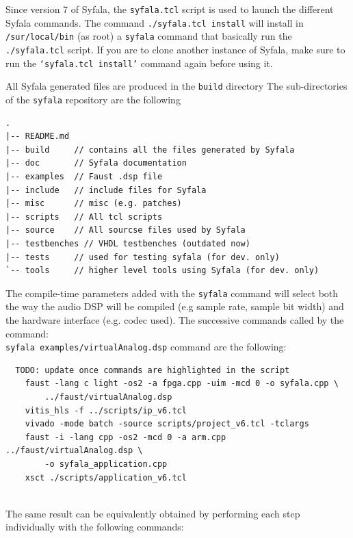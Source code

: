 \documentclass[11pt]{article}
\numberwithin{equation}{section}
\numberwithin{figure}{section}
\begin{document}
Since version 7 of Syfala, the {\tt syfala.tcl} script is used to launch the different Syfala commands. The command \texttt{./syfala.tcl install} will install in {\tt /sur/local/bin}  (as root) a {\tt syfala} command that basically run the {\tt ./syfala.tcl} script. If you are to clone another instance of Syfala, make sure to run the {\tt `syfala.tcl install'} command again before using it.

All Syfala generated files are produced in the {\tt build} directory 
The sub-directories of the {\tt syfala} repository are the following
\begin{verbatim}
.
|-- README.md
|-- build     // contains all the files generated by Syfala
|-- doc       // Syfala documentation 
|-- examples  // Faust .dsp file
|-- include   // include files for Syfala
|-- misc      // misc (e.g. patches)
|-- scripts   // All tcl scripts
|-- source    // All sourcse files used by Syfala
|-- testbenches // VHDL testbenches (outdated now) 
|-- tests     // used for testing syfala (for dev. only) 
`-- tools     // higher level tools using Syfala (for dev. only)
\end{verbatim}

The compile-time parameters added with the {\tt syfala} command will select both the way the audio DSP will be compiled (e.g sample rate, sample bit width) and the hardware interface (e.g. codec used). The successive commands called by the command: \\
{\tt syfala examples/virtualAnalog.dsp} command  are the following:\\

  \begin{boxedminipage}{\textwidth}
\begin{verbatim}
  TODO: update once commands are highlighted in the script
    faust -lang c light -os2 -a fpga.cpp -uim -mcd 0 -o syfala.cpp \
        ../faust/virtualAnalog.dsp
    vitis_hls -f ../scripts/ip_v6.tcl
    vivado -mode batch -source scripts/project_v6.tcl -tclargs 
    faust -i -lang cpp -os2 -mcd 0 -a arm.cpp ../faust/virtualAnalog.dsp \
        -o syfala_application.cpp
    xsct ./scripts/application_v6.tcl
\end{verbatim}
\end{boxedminipage}

  ~\\
  The same result can be equivalently obtained by performing each step individually with the following commands:\\
\end{document}
